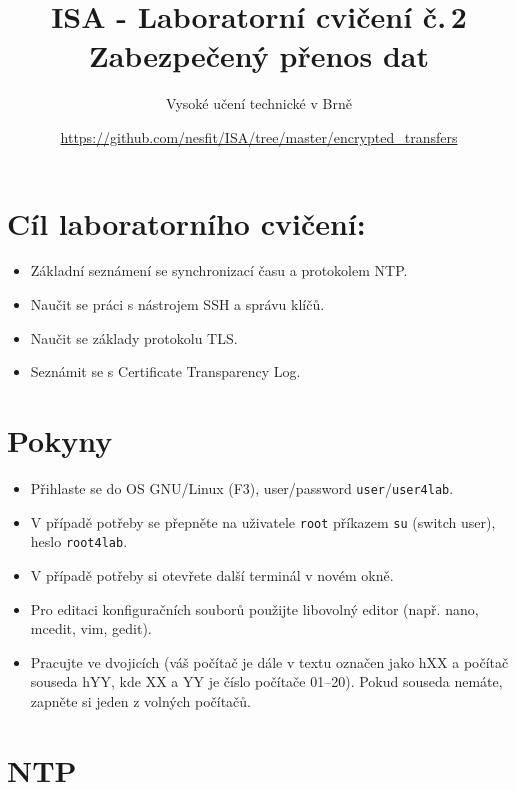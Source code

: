\documentclass[a4paper,11pt]{article}
\title{ISA - Laboratorní cvičení č.\,2\\
{\bf\large Zabezpečený přenos dat}}
\author{Vysoké učení technické v Brně}
\date{\url{https://github.com/nesfit/ISA/tree/master/encrypted_transfers}}
\begin{document}
{\let\newpage\relax\maketitle}

\section*{Cíl laboratorního cvičení:}
\begin{itemize}
  \item Základní seznámení se synchronizací času a protokolem NTP.
  \item Naučit se práci s nástrojem SSH a správu klíčů.
  \item Naučit se základy protokolu TLS.
  \item Seznámit se s Certificate Transparency Log.
\end{itemize}

\section*{Pokyny}
\begin{itemize}
  \item Přihlaste se do OS GNU/Linux (F3), user/password {\tt user}/{\tt user4lab}.
  \item V případě potřeby se přepněte na uživatele {\tt root} příkazem {\tt su}
  (switch user), heslo {\tt root4lab}.
  \item V případě potřeby si otevřete další terminál v novém okně.
  \item Pro editaci konfiguračních souborů použijte libovolný editor (např.
  nano, mcedit, vim, gedit).
\item Pracujte ve dvojicích (váš počítač je dále v textu označen jako hXX a
  počítač souseda hYY, kde XX a YY je číslo počítače 01--20).
  Pokud souseda nemáte, zapněte si jeden z volných počítačů.

\end{itemize}

\section{NTP}
\end{document}
